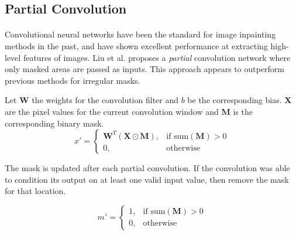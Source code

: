 \documentclass{article}
\begin{document}
\subsection{Partial Convolution}
\paragraph{}
Convolutional neural networks have been the standard for image inpainting methods in the past, and have shown excellent performance at extracting high-level features of images. Liu et al. proposes a \textit{partial} convolution network where only masked areas are passed as inputs. This approach appears to outperform previous methods for irregular masks.

Let $\mathbf{W}$ the weights for the convolution filter and $\mathit{b}$ be the corresponding bias. $\mathbf{X}$ are the pixel values for the current convolution window and $\mathbf{M}$ is the corresponding binary mask.
\begin{equation}
	x'=
    \begin{cases}
        \mathbf{W}^{T}(\mathbf{X} \odot \mathbf{M}), & \textrm{if\ sum}(\mathbf{M}) > 0\\
        0, & \text{otherwise}
    \end{cases}
\end{equation}

The mask is updated after each partial convolution. If the convolution was able to condition its output on at least one valid input value, then remove the mask for that location.

\begin{equation}
	m'=
    \begin{cases}
        1, & \textrm{if\ sum}(\mathbf{M}) > 0\\
        0, & \text{otherwise}
    \end{cases}
\end{equation}
\end{document}
